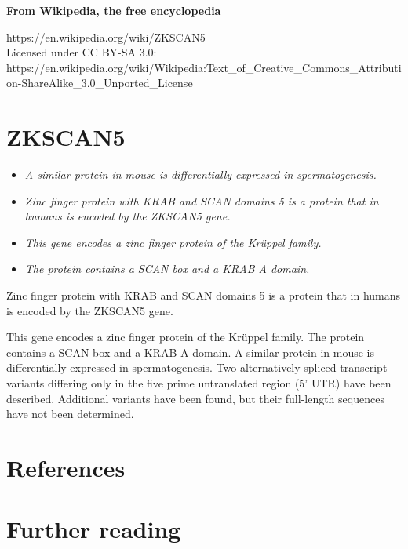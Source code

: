 \textbf{From Wikipedia, the free encyclopedia}

https://en.wikipedia.org/wiki/ZKSCAN5\\
Licensed under CC BY-SA 3.0:\\
https://en.wikipedia.org/wiki/Wikipedia:Text\_of\_Creative\_Commons\_Attribution-ShareAlike\_3.0\_Unported\_License

\section{ZKSCAN5}\label{zkscan5}

\begin{itemize}
\item
  \emph{A similar protein in mouse is differentially expressed in
  spermatogenesis.}
\item
  \emph{Zinc finger protein with KRAB and SCAN domains 5 is a protein
  that in humans is encoded by the ZKSCAN5 gene.}
\item
  \emph{This gene encodes a zinc finger protein of the Krüppel family.}
\item
  \emph{The protein contains a SCAN box and a KRAB A domain.}
\end{itemize}

Zinc finger protein with KRAB and SCAN domains 5 is a protein that in
humans is encoded by the ZKSCAN5 gene.

This gene encodes a zinc finger protein of the Krüppel family. The
protein contains a SCAN box and a KRAB A domain. A similar protein in
mouse is differentially expressed in spermatogenesis. Two alternatively
spliced transcript variants differing only in the five prime
untranslated region (5' UTR) have been described. Additional variants
have been found, but their full-length sequences have not been
determined.

\section{References}\label{references}

\section{Further reading}\label{further-reading}
